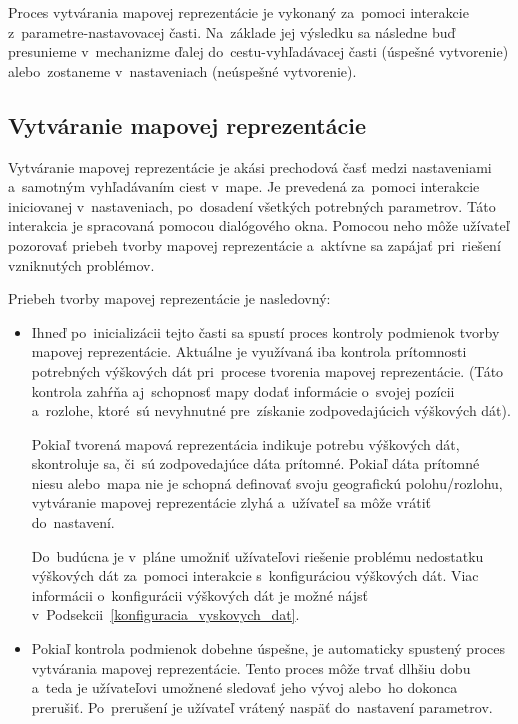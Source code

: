 Proces vytvárania mapovej reprezentácie je vykonaný za~pomoci interakcie z~parametre-nastavovacej časti. Na~základe jej výsledku sa následne buď presunieme v~mechanizme ďalej do~cestu-vyhľadávacej časti (úspešné vytvorenie) alebo~zostaneme v~nastaveniach (neúspešné vytvorenie).  

\subsection{Vytváranie mapovej reprezentácie}

Vytváranie mapovej reprezentácie je akási prechodová časť medzi nastaveniami a~samotným vyhľadávaním ciest v~mape. Je prevedená za~pomoci interakcie iniciovanej v~nastaveniach, po~dosadení všetkých potrebných parametrov. Táto interakcia je spracovaná pomocou dialógového okna. Pomocou neho môže užívateľ pozorovať priebeh tvorby mapovej reprezentácie a~aktívne sa zapájať pri~riešení vzniknutých problémov.  

Priebeh tvorby mapovej reprezentácie je nasledovný:
\begin{itemize}
    \item Ihneď po~inicializácii tejto časti sa spustí proces kontroly podmienok tvorby mapovej reprezentácie. Aktuálne je využívaná iba kontrola prítomnosti potrebných výškových dát pri~procese tvorenia mapovej reprezentácie. (Táto kontrola zahŕňa aj~schopnosť mapy dodať informácie o~svojej pozícii a~rozlohe, ktoré~sú nevyhnutné pre~získanie zodpovedajúcich výškových dát).
    
    Pokiaľ tvorená mapová reprezentácia indikuje potrebu výškových dát, skontroluje sa, či~sú zodpovedajúce dáta prítomné. Pokiaľ dáta prítomné niesu alebo~mapa nie je schopná definovať svoju geografickú polohu/rozlohu, vytváranie mapovej reprezentácie zlyhá a~užívateľ sa môže vrátiť do~nastavení. 
    
    Do~budúcna je v~pláne umožniť užívateľovi riešenie problému nedostatku výškových dát za~pomoci interakcie s~konfiguráciou výškových dát. Viac informácii o~konfigurácii výškových dát je možné nájsť v~Podsekcii~\ref{konfiguracia_vyskovych_dat}.
    \item Pokiaľ kontrola podmienok dobehne úspešne, je automaticky spustený proces vytvárania mapovej reprezentácie. Tento proces môže trvať dlhšiu dobu a~teda je užívateľovi umožnené sledovať jeho vývoj alebo~ho dokonca prerušiť. Po~prerušení je užívateľ vrátený naspäť do~nastavení parametrov.
\end{itemize}

